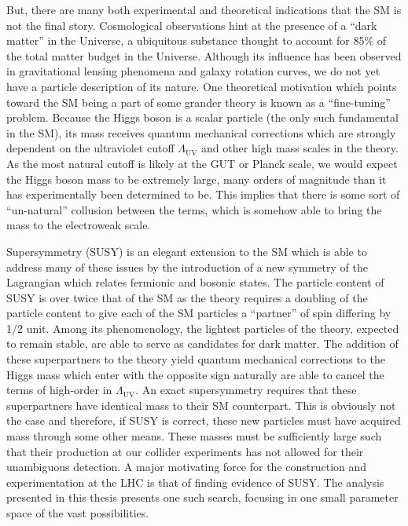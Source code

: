 But, there are many both experimental and theoretical indications that the SM is not the final story. Cosmological observations hint at the presence of a ``dark matter'' in the Universe, a ubiquitous substance thought to account for 85\% of the total matter budget in the Universe. Although its influence has been observed in gravitational lensing phenomena and galaxy rotation curves, we do not yet have a particle description of its nature. One theoretical motivation which points toward the SM being a part of some grander theory is known as a ``fine-tuning'' problem. Because the Higgs boson is a scalar particle (the only such fundamental in the SM), its mass receives quantum mechanical corrections which are strongly dependent on the ultraviolet cutoff $\Lambda_{\textrm{UV}}$ and other high mass scales in the theory. As the most natural cutoff is likely at the GUT or Planck scale, we would expect the Higgs boson mass to be extremely large, many orders of magnitude than it has experimentally been determined to be. This implies that there is some sort of ``un-natural'' collusion between the terms, which is somehow able to bring the mass to the electroweak scale.

Supersymmetry (SUSY) is an elegant extension to the SM which is able to address many of these issues by the introduction of a new symmetry of the Lagrangian which relates fermionic and bosonic states. The particle content of SUSY is over twice that of the SM as the theory requires a doubling of the particle content to give each of the SM particles a ``partner'' of spin differing by 1/2 unit. Among its phenomenology, the lightest particles of the theory, expected to remain stable, are able to serve as candidates for dark matter. The addition of these superpartners to the theory yield quantum mechanical corrections to the Higgs mass which enter with the opposite sign naturally are able to cancel the terms of high-order in $\Lambda_{\textrm{UV}}$. An exact supersymmetry requires that these superpartners have identical mass to their SM counterpart. This is obviously not the case and therefore, if SUSY is correct, these new particles must have acquired mass through some other means. These masses must be sufficiently large such that their production at our collider experiments has not allowed for their unambiguous detection. A major motivating force for the construction and experimentation at the LHC is that of finding evidence of SUSY. The analysis presented in this thesis presents one such search, focusing in one small parameter space of the vast possibilities.

